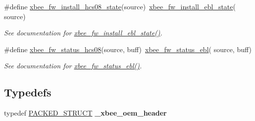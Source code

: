 \begin{DoxyCompactItemize}
\item 
\hypertarget{group__xbee__firmware_gae475cea6680670df9180ef1ce2603fb6}{\#define \hyperlink{group__xbee__firmware_gae475cea6680670df9180ef1ce2603fb6}{xbee\-\_\-fw\-\_\-install\-\_\-hcs08\-\_\-state}(source)~\hyperlink{group__xbee__firmware_ga8590708a38ac57ace8c816cc7cfd0859}{xbee\-\_\-fw\-\_\-install\-\_\-ebl\-\_\-state}( source)}\label{group__xbee__firmware_gae475cea6680670df9180ef1ce2603fb6}

\begin{DoxyCompactList}\small\item\em See documentation for \hyperlink{group__xbee__firmware_ga8590708a38ac57ace8c816cc7cfd0859}{xbee\-\_\-fw\-\_\-install\-\_\-ebl\-\_\-state()}. \end{DoxyCompactList}\item 
\hypertarget{group__xbee__firmware_ga8fb52237a7a070f5e2c56ef410c5f0f3}{\#define \hyperlink{group__xbee__firmware_ga8fb52237a7a070f5e2c56ef410c5f0f3}{xbee\-\_\-fw\-\_\-status\-\_\-hcs08}(source, buff)~\hyperlink{group__xbee__firmware_ga8bee6e4bb7564c51bb38129e97a12e99}{xbee\-\_\-fw\-\_\-status\-\_\-ebl}( source, buff)}\label{group__xbee__firmware_ga8fb52237a7a070f5e2c56ef410c5f0f3}

\begin{DoxyCompactList}\small\item\em See documentation for \hyperlink{group__xbee__firmware_ga8bee6e4bb7564c51bb38129e97a12e99}{xbee\-\_\-fw\-\_\-status\-\_\-ebl()}. \end{DoxyCompactList}\end{DoxyCompactItemize}
\subsection*{Typedefs}
\begin{DoxyCompactItemize}
\item 
typedef \hyperlink{group___s_x_a_ga4233297bd31be5c273d4fb0758cc54d7}{P\-A\-C\-K\-E\-D\-\_\-\-S\-T\-R\-U\-C\-T} {\bfseries \-\_\-xbee\-\_\-oem\-\_\-header}
\end{DoxyCompactItemize}
